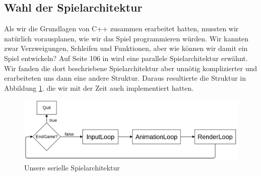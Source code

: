 \documentclass[12pt,a4paper]{scrartcl}
\begin{document}
\subsection{Wahl der Spielarchitektur}
Als wir die Grundlagen von C++ zusammen erarbeitet hatten, mussten wir natürlich vorausplanen, wie wir das Spiel programmieren würden.
Wir kannten zwar Verzweigungen, Schleifen und Funktionen, aber wie können wir damit ein Spiel entwickeln? Auf Seite 106 in \cite{sfml_gamedev} 
wird eine parallele Spielarchitektur erwähnt. Wir fanden die dort beschriebene Spielarchitektur aber unnötig komplizierter und erarbeiteten uns
dann eine andere Struktur. Daraus resultierte die Struktur in Abbildung \ref{fig:seriell}.
die wir mit der Zeit auch implementiert hatten.\\
\begin{figure}[h]
\centering
\includegraphics[scale=0.3]{img/gameloops.png}
\caption{Unsere serielle Spielarchitektur}
\label{fig:seriell}
\end{figure}
\end{document}
